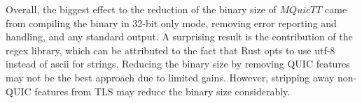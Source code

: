 Overall, the biggest effect to the reduction of the binary size of $MQuicTT$ came from compiling the binary in 32-bit only mode, removing error reporting and handling, and any standard output.
A surprising result is the contribution of the regex library, which can be attributed to the fact that Rust opts to use utf-8 instead of ascii for strings.
Reducing the binary size by removing QUIC features may not be the best approach due to limited gains.
However, stripping away non-QUIC features from TLS may reduce the binary size considerably.

